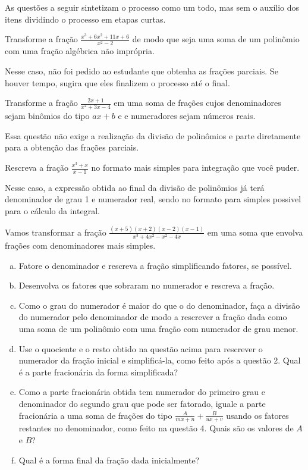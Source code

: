 \documentclass[main_estudante.tex]{subfiles}
\begin{document}
As questões a seguir sintetizam o processo como um todo, mas sem o auxílio dos itens dividindo o processo em etapas curtas.

\begin{questao}
Transforme a fração $\frac{x^3+6x^2+11x+6}{x^2-2}$ de modo que seja uma soma de um polinômio com uma fração algébrica não imprópria.
\end{questao}

Nesse caso, não foi pedido ao estudante que obtenha as frações parciais. Se houver tempo, sugira que eles finalizem o processo até o final.

\begin{questao}
Transforme a fração $\frac{2x+1}{x^2+3x-4}$ em uma soma de frações cujos denominadores sejam binômios do tipo $ax+b$ e e numeradores sejam números reais.
\end{questao}

Essa questão não exige a realização da divisão de polinômios e parte diretamente para a obtenção das frações parciais.

\begin{questao}
Rescreva a fração $\frac{x^3+x}{x-1}$ no formato mais simples para integração que você puder.
\end{questao}

Nesse caso, a expressão obtida ao final da divisão de polinômios já terá denominador de grau 1 e numerador real, sendo no formato para simples possivel para o cálculo da integral.

\begin{questao}
Vamos transformar a fração $\frac{(x+5)(x+2)(x-2)(x-1)}{x^3+4x^2-x^2-4x}$ em uma soma que envolva frações com denominadores mais simples.
\begin{enumerate}[a)]
\item Fatore o denominador e rescreva a fração simplificando fatores, se possível.
\item Desenvolva os fatores que sobraram no numerador e rescreva a fração.
\item Como o grau do numerador é maior do que o do denominador, faça a divisão do numerador pelo denominador de modo a rescrever a fração dada como uma soma de um polinômio com uma fração com numerador de grau menor.
\item Use o quociente e o resto obtido na questão acima para rescrever o numerador da fração inicial e simplificá-la, como feito após a questão 2. Qual é a parte fracionária da forma simplificada?
\item Como a parte fracionária obtida tem numerador do primeiro grau e denominador do segundo grau que pode ser fatorado, iguale a parte fracionária a uma soma de frações do tipo $\frac{A}{mx+n}+\frac{B}{ux+v}$ usando os fatores restantes no denominador, como feito na questão 4. Quais são os valores de $A$ e $B$?
\item Qual é a forma final da fração dada inicialmente?
\end{enumerate}
\end{questao}
\end{document}
